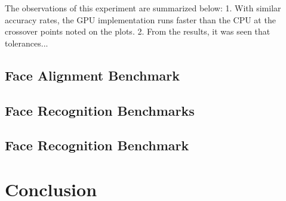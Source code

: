 \documentclass[10pt,twocolumn,letterpaper]{article}
\begin{document}
The observations of this experiment are summarized below:
1.  With similar accuracy rates, the GPU implementation runs faster than the CPU at the crossover points 
noted on the plots.
2.  From the results, it was seen that tolerances...

\subsection{Face Alignment Benchmark}
\label{sec:alignment_benchmark}

\subsection{Face Recognition Benchmarks}
\label{sec:recognition_benchmark}

\subsection{Face Recognition Benchmark}
\label{sec:pipeline_benchmark}

\section{Conclusion}

{\small


}
\end{document}
